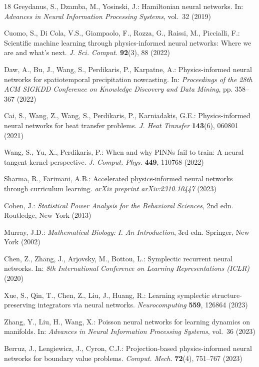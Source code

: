 \documentclass[pdflatex,sn-mathphys-num]{sn-jnl}
\theoremstyle{thmstyleone}%
\theoremstyle{thmstyletwo}%
\theoremstyle{thmstylethree}%
\begin{document}
\begin{thebibliography}{18}
		Greydanus, S., Dzamba, M., Yosinski, J.: Hamiltonian neural networks. In: \textit{Advances in Neural Information Processing Systems}, vol.~32 (2019)
		
		Cuomo, S., Di Cola, V.S., Giampaolo, F., Rozza, G., Raissi, M., Piccialli, F.: Scientific machine learning through physics-informed neural networks: Where we are and what's next. \textit{J. Sci. Comput.} \textbf{92}(3), 88 (2022)
		
		Daw, A., Bu, J., Wang, S., Perdikaris, P., Karpatne, A.: Physics-informed neural networks for spatiotemporal precipitation nowcasting. In: \textit{Proceedings of the 28th ACM SIGKDD Conference on Knowledge Discovery and Data Mining}, pp. 358--367 (2022)
		
		Cai, S., Wang, Z., Wang, S., Perdikaris, P., Karniadakis, G.E.: Physics-informed neural networks for heat transfer problems. \textit{J. Heat Transfer} \textbf{143}(6), 060801 (2021)
		
		Wang, S., Yu, X., Perdikaris, P.: When and why PINNs fail to train: A neural tangent kernel perspective. \textit{J. Comput. Phys.} \textbf{449}, 110768 (2022)
		
		Sharma, R., Farimani, A.B.: Accelerated physics-informed neural networks through curriculum learning. \textit{arXiv preprint arXiv:2310.10447} (2023)
		
		Cohen, J.: \textit{Statistical Power Analysis for the Behavioral Sciences}, 2nd edn. Routledge, New York (2013)
		
		Murray, J.D.: \textit{Mathematical Biology: I. An Introduction}, 3rd edn. Springer, New York (2002)
		
		Chen, Z., Zhang, J., Arjovsky, M., Bottou, L.: Symplectic recurrent neural networks. In: \textit{8th International Conference on Learning Representations (ICLR)} (2020)
		
		Xue, S., Qin, T., Chen, Z., Liu, J., Huang, R.: Learning symplectic structure-preserving integrators via neural networks. \textit{Neurocomputing} \textbf{559}, 126864 (2023)
		
		Zhang, Y., Liu, H., Wang, X.: Poisson neural networks for learning dynamics on manifolds. In: \textit{Advances in Neural Information Processing Systems}, vol.~36 (2023)
		
		Berruz, J., Lengiewicz, J., Cyron, C.J.: Projection-based physics-informed neural networks for boundary value problems. \textit{Comput. Mech.} \textbf{72}(4), 751--767 (2023)
		
	\end{thebibliography}
	
\end{document}
